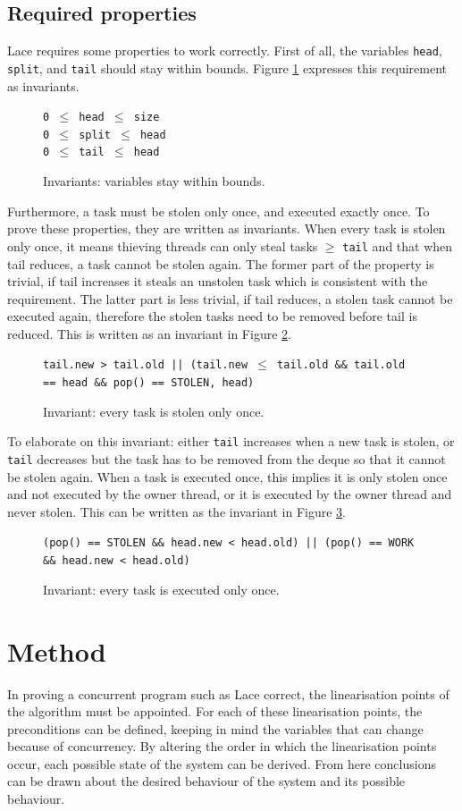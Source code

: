 \documentclass{sig-alternate-br}
\begin{document}
\subsection{Required properties}
Lace requires some properties to work correctly.
First of all, the variables \texttt{head}, \texttt{split}, and \texttt{tail} should stay within bounds.
Figure \ref{inv:bounds} expresses this requirement as invariants. 
\begin{figure}[h]
	\texttt{0 $\leq$ head $\leq$ size}\\
	\texttt{0 $\leq$ split $\leq$ head}\\
	\texttt{0 $\leq$ tail $\leq$ head}
	\caption{Invariants: variables stay within bounds.}
	\label{inv:bounds}
\end{figure}
Furthermore, a task must be stolen only once, and executed exactly once.
To prove these properties, they are written as invariants.
When every task is stolen only once, it means thieving threads can only steal tasks $\geq$ \texttt{tail} and that when tail reduces, a task cannot be stolen again. The former part of the property is trivial, if tail increases it steals an unstolen task which is consistent with the requirement. The latter part is less trivial, if tail reduces, a stolen task cannot be executed again, therefore the stolen tasks need to be removed before tail is reduced. This is written as an invariant in Figure \ref{inv:stolen}.
\begin{figure}[h]
	\texttt{tail.new > tail.old || (tail.new $\leq$ tail.old \&\& tail.old == head \&\& pop() == STOLEN, head)}
	\caption{Invariant: every task is stolen only once.}
	\label{inv:stolen}
\end{figure}
To elaborate on this invariant: either \texttt{tail} increases when a new task is stolen, or \texttt{tail} decreases but the task has to be removed from the deque so that it cannot be stolen again.
When a task is executed once, this implies it is only stolen once and not executed by the owner thread, or it is executed by the owner thread and never stolen. This can be written as the invariant in Figure \ref{inv:exec}.
\begin{figure}[h]
	\texttt{(pop() == STOLEN \&\& head.new < head.old) || (pop() == WORK \&\& head.new < head.old)}
	\caption{Invariant: every task is executed only once.}
	\label{inv:exec}
\end{figure}

\section{Method}
In proving a concurrent program such as Lace correct, the linearisation points of the algorithm must be appointed.
For each of these linearisation points, the preconditions can be defined, keeping in mind the variables that can change because of concurrency.
By altering the order in which the linearisation points occur, each possible state of the system can be derived.
From here conclusions can be drawn about the desired behaviour of the system and its possible behaviour.
\end{document}

